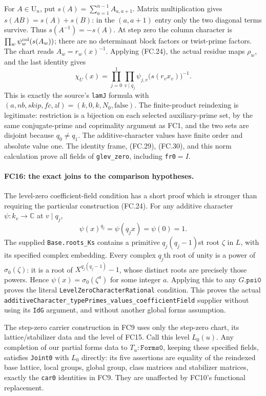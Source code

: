\documentclass[11pt,a4paper]{article}
\numberwithin{equation}{section}
\theoremstyle{remark}\newtheorem{remark}[theorem]{Remark}
\begin{document}
For $A\in\mathrm U_n$, put
$s(A)=\sum_{a=1}^{n-1}A_{a,a+1}$. Matrix multiplication gives
$s(AB)=s(A)+s(B)$: in the $(a,a+1)$ entry only the two diagonal
terms survive. Thus $s(A^{-1})=-s(A)$.
At step zero the column character is
$\prod_w\psi_w^{\rm col}(s(A_w))$; there are no determinant
block factors or twist-prime factors. The chart reads
$A_w=r_w(x)^{-1}$. Applying (FC.24), the actual residue maps
$\rho_w$, and the last identity gives
\[
 \chi_U(x)=\prod_{j=0}^1\prod_{v\mid q_j}
               \psi_{j,v}\bigl(s(r_vx_v)\bigr)^{-1}. \tag{FC.30}
\]
This is exactly the source's \texttt{lamJ} formula with
$(a,nb,skip,fc,zl)=(k,0,k,N_0,\mathrm{false})$.
The finite-product reindexing is legitimate: restriction is a bijection
on each selected auxiliary-prime set, by the same conjugate-prime and
coprimality argument as FC1, and the two sets are disjoint because
$q_0\ne q_1$. The additive-character values have finite order and
absolute value one. The identity frame, (FC.29), (FC.30), and this norm
calculation prove all fields of \texttt{glev\_\allowbreak zero}, including
\texttt{fr0}$=I$.

\paragraph{FC16: the exact joins to the comparison hypotheses.}
The level-zero coefficient-field condition has a short proof which is
stronger than requiring the particular construction (FC.24).
For any additive character $\psi:k_v\to\mathbb C$ at $v\mid q_j$,
\[
 \psi(x)^{q_j}=\psi(q_jx)=\psi(0)=1.                 \tag{FC.31}
\]
The supplied \texttt{Base.roots\_\allowbreak Ks} contains a primitive
$q_j(q_j-1)$st root $\zeta$ in $L$, with its specified complex
embedding. Every complex $q_j$th root of unity is a power of
$\sigma_0(\zeta)$: it is a root of
$X^{q_j(q_j-1)}-1$, whose distinct roots are precisely those powers.
Hence $\psi(x)=\sigma_0(\zeta^a)$ for some integer $a$.
Applying this to any $G.\texttt{psi0}$ proves the literal
\texttt{LevelZeroCharacterRational} condition. This proves the actual
\texttt{additiveCharacter\_\allowbreak typePrimes\_\allowbreak values\_\allowbreak coefficientField}
supplier without using its \texttt{IdG} argument, and without another
global forms assumption.

The step-zero carrier construction in FC9 uses only the step-zero
chart, its lattice/stabilizer data and the level of FC15. Call this
level $L_0(u)$. Any completion of our partial forms data to
$T_u:\texttt{Forms0}$, keeping these specified fields, satisfies
\texttt{Joint0} with $L_0$ directly: its five assertions are equality
of the reindexed base lattice, local groups, global group, class matrices
and stabilizer matrices, exactly the \texttt{car0} identities in FC9.
They are unaffected by FC10's functional replacement.
\end{document}

